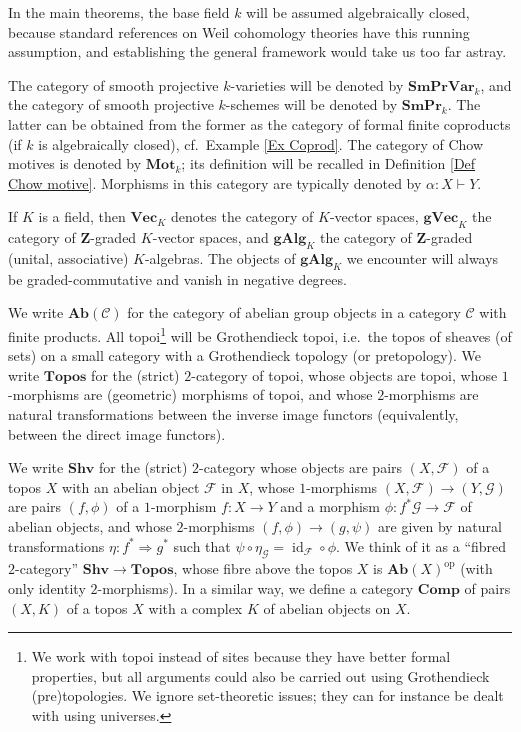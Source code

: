 \documentclass[11pt]{amsart}
\theoremstyle{definition}
\newcommand{\Z}{\mathbf Z}
\newcommand{\op}{^{\operatorname{op}}}
\newcommand{\id}{\operatorname{id}}
\newcommand{\cto}{\vdash}
\newcommand{\Ra}{\Rightarrow}
\newcommand{\Ab}{\mathbf{Ab}}
\newcommand{\Topos}{\mathbf{Topos}}
\newcommand{\SHV}{\mathbf{Shv}}
\newcommand{\COMP}{\mathbf{Comp}}
\renewcommand{\Vec}{\mathbf{Vec}}
\newcommand{\gVec}{\mathbf{gVec}}
\newcommand{\gAlg}{\mathbf{gAlg}}
\newcommand{\SmPr}{\mathbf{SmPr}}
\newcommand{\SmPrVar}{\mathbf{SmPrVar}}
\newcommand{\M}{\mathbf{Mot}}
\begin{document}
In the main theorems, the base field $k$ will be assumed
algebraically closed, because standard references on Weil cohomology
theories have this running assumption, and establishing the general
framework would take us too far astray.

The category of smooth projective $k$-varieties will be denoted by
$\SmPrVar_k$, and the category of smooth projective $k$-schemes will
be denoted by $\SmPr_k$. The latter can be obtained from the former
as the category of formal finite coproducts (if $k$ is algebraically
closed), cf.~Example \ref{Ex Coprod}. The category of Chow motives
is denoted by $\M_k$; its definition will be recalled in Definition
\ref{Def Chow motive}. Morphisms in this category are typically
denoted by $\alpha \colon X \cto Y$.

If $K$ is a field, then $\Vec_K$ denotes the category of $K$-vector
spaces, $\gVec_K$ the category of $\Z$-graded $K$-vector spaces, and
$\gAlg_K$ the category of $\Z$-graded (unital, associative)
$K$-algebras. The objects of $\gAlg_K$ we encounter will always be
graded-commutative and vanish in negative degrees.

We write $\Ab(\mathscr C)$ for the category of abelian group objects
in a category $\mathscr C$ with finite products. All
topoi\footnote{We work with topoi instead of sites because they have
better formal properties, but all arguments could also be carried
out using Grothendieck (pre)topologies. We ignore set-theoretic
issues; they can for instance be dealt with using universes.} will
be Grothendieck topoi, i.e.~the topos of sheaves (of sets) on a
small category with a Grothendieck topology (or pretopology). We
write $\Topos$ for the (strict) $2$-category of topoi, whose objects
are topoi, whose $1$-morphisms are (geometric) morphisms of topoi,
and whose $2$-morphisms are natural transformations between the
inverse image functors (equivalently, between the direct image
functors).

We write $\SHV$ for the (strict) $2$-category whose objects are
pairs $(X,\mathscr F)$ of a topos $X$ with an abelian object
$\mathscr F$ in $X$, whose $1$-morphisms $(X,\mathscr F) \to
(Y,\mathscr G)$ are pairs $(f,\phi)$ of a $1$-morphism $f \colon X
\to Y$ and a morphism $\phi \colon f^* \mathscr G \to \mathscr F$ of
abelian objects, and whose $2$-morphisms $(f,\phi) \to (g, \psi)$
are given by natural transformations $\eta \colon f^* \Ra g^*$ such
that $\psi \circ \eta_{\mathscr G} = \id_{\mathscr F} \circ \phi$.
We think of it as a ``fibred $2$-category'' $\SHV \to \Topos$, whose
fibre above the topos $X$ is $\Ab(X)\op$ (with only identity
$2$-morphisms). In a similar way, we define a category $\COMP$ of
pairs $(X,K)$ of a topos $X$ with a complex $K$ of abelian objects
on $X$.
\end{document}
